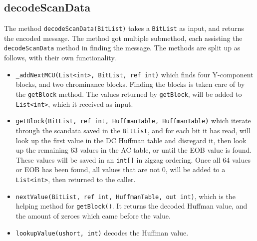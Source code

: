 \subsection{decodeScanData}
The method \lstinline|decodeScanData(BitList)| takes a \lstinline|BitList| as input, and returns the encoded message.
The method got multiple submethod, each assisting the \lstinline|decodeScanData| method in finding the message. The methods are split up as follows, with their own functionality.
\begin{itemize}
	\item \lstinline|_addNextMCU(List<int>, BitList, ref int)| which finds four Y-component blocks, and two chrominance blocks. Finding the blocks is taken care of by the \lstinline|getBlock| method. The values returned by \lstinline|getBlock|, will be added to \lstinline|List<int>|, which it received as input.
	\item \lstinline|getBlock(BitList, ref int, HuffmanTable, HuffmanTable)| which iterate through the scandata saved in the \lstinline|BitList|, and for each bit it has read, will look up the first value in the DC Huffman table and disregard it, then look up the remaining 63 values in the AC table, or until the EOB value is found.
	These values will be saved in an \lstinline|int[]| in zigzag ordering.
	Once all 64 values or EOB has been found, all values that are not 0, will be added to a \lstinline|List<int>|, then returned to the caller.
	\item \lstinline|nextValue(BitList, ref int, HuffmanTable, out int)|, which is the helping method for \lstinline|getBlock()|. It returns the decoded Huffman value, and the amount of zeroes which came before the value.
	\item \lstinline|lookupValue(ushort, int)| decodes the Huffman value.
\end{itemize}


